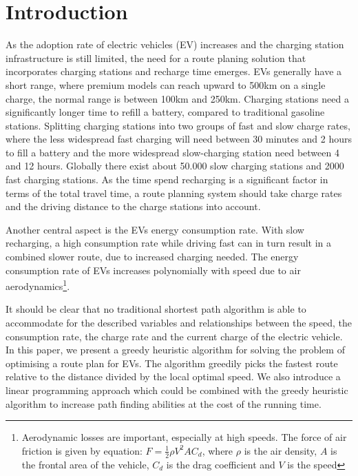 \section{Introduction}

As the adoption rate of electric vehicles (EV) increases \cite{Henry2013} and the charging station infrastructure is still limited, the need for a route planing solution that incorporates charging stations and recharge time emerges. EVs generally have a short range, where premium models can reach upward to 500km on a single charge, the normal range is between 100km and 250km. Charging stations need a significantly longer time to refill a battery, compared to traditional gasoline stations. Splitting charging stations into two groups of fast and slow charge rates, where the less widespread fast charging will need between 30 minutes and 2 hours to fill a battery and the more widespread slow-charging station need between 4 and 12 hours. Globally there exist about 50.000 slow charging stations and 2000 fast charging stations\cite{Globalevoutlook}. As the time spend recharging is a significant factor in terms of the total travel time, a route planning system should take charge rates and the driving distance to the charge stations into account.

Another central aspect is the EVs energy consumption rate. With slow recharging, a high consumption rate while driving fast can in turn result in a combined slower route, due to increased charging needed. The energy consumption rate of EVs increases polynomially with speed due to air aerodynamics\footnote{Aerodynamic losses are important, especially at high speeds. The force of air friction is given by equation: $F = \frac{1}{2} \rho V^2 A C_d$, where $\rho$ is the air density, $A$ is the frontal area of the vehicle, $C_d$ is the drag coefficient and $V$ is the speed}.

It should be clear that no traditional shortest path algorithm is able to accommodate for the described variables and relationships between the speed, the consumption rate, the charge rate and the current charge of the electric vehicle. In this paper, we present a greedy heuristic algorithm for solving the problem of optimising a route plan for EVs. The algorithm greedily picks the fastest route relative to the distance divided by the local optimal speed. We also introduce a linear programming approach which could be combined with the greedy heuristic algorithm to increase path finding abilities at the cost of the running time.  

